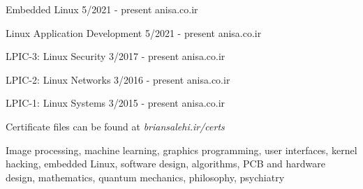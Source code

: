 \documentclass[a4paper,12pt]{memoir} %
\begin{document}




{Embedded Linux}
{5/2021 - present}
{}
{anisa.co.ir}


{Linux Application Development}
{5/2021 - present}
{}
{anisa.co.ir}


{LPIC-3: Linux Security}
{3/2017 - present}
{}
{anisa.co.ir}


{LPIC-2: Linux Networks}
{3/2016 - present}
{}
{anisa.co.ir}


{LPIC-1: Linux Systems}
{3/2015 - present}
{}
{anisa.co.ir}


Certificate files can be found at \textit{briansalehi.ir/certs}\par

\Sep %




{Image processing, machine learning, graphics programming, user interfaces, kernel hacking, embedded Linux, software design, algorithms, PCB and hardware design, mathematics, quantum mechanics, philosophy, psychiatry}

\end{document}

